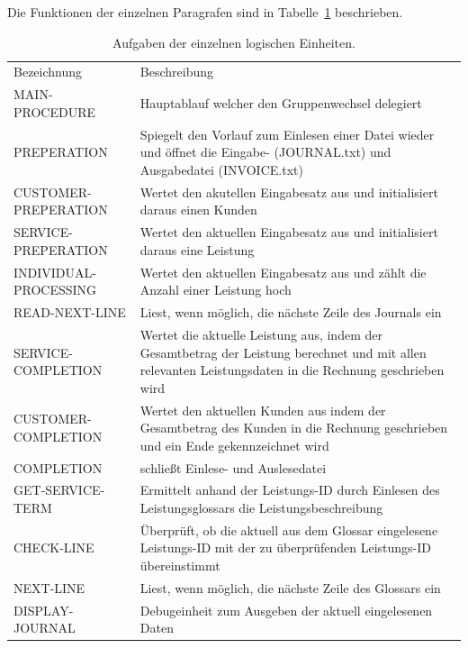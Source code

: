 Die Funktionen der einzelnen Paragrafen sind in Tabelle~\ref{tab:prog-strukt} beschrieben.


\begin{table}[!htb]
    \centering
    \begin{tabularx}{\textwidth}{X | X }
       \rowcolor{fhfarbe!25}
       Bezeichnung                             & Beschreibung             \\
       \rowcolor{fhfarbe!10}
       MAIN-PROCEDURE & Hauptablauf welcher den Gruppenwechsel delegiert \\
       PREPERATION & Spiegelt den Vorlauf zum Einlesen einer Datei wieder und öffnet die Eingabe- (JOURNAL.txt) und Ausgabedatei (INVOICE.txt) \\
       CUSTOMER-PREPERATION & Wertet den akutellen Eingabesatz aus und initialisiert daraus einen Kunden \\
       SERVICE-PREPERATION & Wertet den aktuellen Eingabesatz aus und initialisiert daraus eine Leistung \\
       INDIVIDUAL-PROCESSING & Wertet den aktuellen Eingabesatz aus und zählt die Anzahl einer Leistung hoch \\
       READ-NEXT-LINE & Liest, wenn möglich, die nächste Zeile des Journals ein \\
       SERVICE-COMPLETION & Wertet die aktuelle Leistung aus, indem der Gesamtbetrag der Leistung berechnet und mit allen relevanten Leistungsdaten in die Rechnung geschrieben wird \\
       CUSTOMER-COMPLETION & Wertet den aktuellen Kunden aus indem der Gesamtbetrag des Kunden in die Rechnung geschrieben und ein Ende gekennzeichnet wird \\
       COMPLETION & schließt Einlese- und Auslesedatei \\
       
       \rowcolor{fhfarbe!10}
       GET-SERVICE-TERM & Ermittelt anhand der Leistungs-ID durch Einlesen des Leistungsglossars die Leistungsbeschreibung \\
       CHECK-LINE & Überprüft, ob die aktuell aus dem Glossar eingelesene Leistungs-ID mit der zu überprüfenden Leistungs-ID übereinstimmt \\
       NEXT-LINE & Liest, wenn möglich, die nächste Zeile des Glossars ein\\
       DISPLAY-JOURNAL & Debugeinheit zum Ausgeben der aktuell eingelesenen Daten \\
    \end{tabularx}
    \caption{Aufgaben der einzelnen logischen Einheiten.}\label{tab:prog-strukt}
\end{table}

